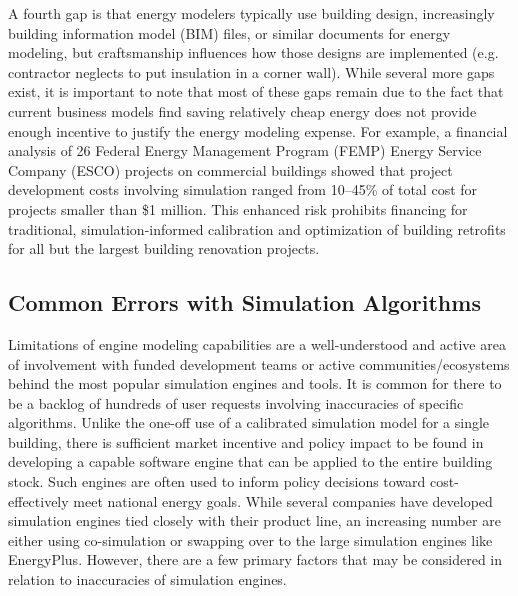 \documentclass[preprint, review, 12pt]{elsarticle}
\begin{document}
A fourth gap is that energy modelers typically use building design, increasingly building information model (BIM) files, or similar documents for energy modeling, but craftsmanship influences how those designs are implemented (e.g. contractor neglects to put insulation in a corner wall). While several more gaps exist, it is important to note that most of these gaps remain due to the fact that current business models find saving relatively cheap energy does not provide enough incentive to justify the energy modeling expense. For example, a financial analysis of 26 Federal Energy Management Program (FEMP) Energy Service Company (ESCO) projects on commercial buildings showed that project development costs involving simulation ranged from 10--45\% of total cost for projects smaller than \$1 million. This enhanced risk prohibits financing for traditional, simulation-informed calibration and optimization of building retrofits for all but the largest building renovation projects.

\subsection{Common Errors with Simulation Algorithms}
Limitations of engine modeling capabilities are a well-understood and active area of involvement with funded development teams or active communities/ecosystems behind the most popular simulation engines and tools. It is common for there to be a backlog of hundreds of user requests involving inaccuracies of specific algorithms. Unlike the one-off use of a calibrated simulation model for a single building, there is sufficient market incentive and policy impact to be found in developing a capable software engine that can be applied to the entire building stock. Such engines are often used to inform policy decisions toward cost-effectively meet national energy goals. While several companies have developed simulation engines tied closely with their product line, an increasing number are either using co-simulation or swapping over to the large simulation engines like EnergyPlus. However, there are a few primary factors that may be considered in relation to inaccuracies of simulation engines.
\end{document}
